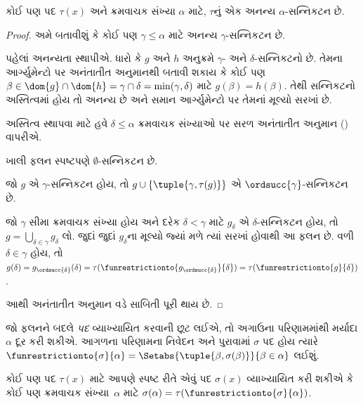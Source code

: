 \begin{lem}[મર્યાદિત પુનરાવર્તન]
કોઈ પણ પદ $\tau(x)$ અને ક્રમવાચક સંખ્યા $\alpha$ માટે,
$\tau$નું એક અનન્ય $\alpha$-સન્નિકટન છે.
\end{lem}
\begin{proof}
અમે બતાવીશું કે કોઈ પણ $\gamma \leq \alpha$ માટે અનન્ય
$\gamma$-સન્નિકટન છે.

પહેલાં અનન્યતા સ્થાપીએ. ધારો કે $g$ અને $h$ અનુક્રમે
$\gamma$- અને $\delta$-સન્નિકટનો છે. તેમના આર્ગ્યુમેન્ટો પર
અનંતાતીત અનુમાનથી બતાવી શકાય કે કોઈ પણ
$\beta \in \dom{g} \cap \dom{h} =
\gamma \cap \delta = \min(\gamma, \delta)$ માટે
$g(\beta) = h(\beta)$. તેથી સન્નિકટનો અસ્તિત્વમાં હોય તો
અનન્ય છે અને સમાન આર્ગ્યુમેન્ટો પર તેમનાં મૂલ્યો સરખાં છે.

અસ્તિત્વ સ્થાપવા માટે હવે $\delta \leq \alpha$ ક્રમવાચક
સંખ્યાઓ પર સરળ અનંતાતીત અનુમાન
() વાપરીએ.

ખાલી ફલન સ્પષ્ટપણે $\emptyset$-સન્નિકટન છે.

જો $g$ એ $\gamma$-સન્નિકટન હોય, તો $g \cup
\{\tuple{\gamma, \tau(g)}\}$ એ $\ordsucc{\gamma}$-સન્નિકટન છે.

જો $\gamma$ સીમા ક્રમવાચક સંખ્યા હોય અને દરેક $\delta < \gamma$
માટે $g_\delta$ એ $\delta$-સન્નિકટન હોય, તો
$g = \bigcup_{\delta \in \gamma} g_\delta$ લો. જુદાં જુદાં
$g_\delta$ના મૂલ્યો જ્યાં મળે ત્યાં સરખાં હોવાથી આ ફલન છે.
વળી $\delta \in \gamma$ હોય, તો
$g(\delta) = g_{\ordsucc{\delta}}(\delta) =
\tau(\funrestrictionto{g_{\ordsucc{\delta}}}{\delta}) =
\tau(\funrestrictionto{g}{\delta})$.

આથી અનંતાતીત અનુમાન વડે સાબિતી પૂરી થાય છે.
\end{proof}

જો ફલનને બદલે \emph{પદ} વ્યાખ્યાયિત કરવાની છૂટ લઈએ, તો અગાઉના
પરિણામમાંથી મર્યાદા $\alpha$ દૂર કરી શકીએ. આગળના પરિણામના નિવેદન
અને પુરાવામાં $\sigma$ પદ હોય ત્યારે
$\funrestrictionto{\sigma}{\alpha} = \Setabs{\tuple{\beta,
\sigma(\beta)}}{\beta \in \alpha}$ લઈશું.

\begin{thm}[સામાન્ય પુનરાવર્તન]
કોઈ પણ પદ $\tau(x)$ માટે આપણે સ્પષ્ટ રીતે એવું પદ
$\sigma(x)$ વ્યાખ્યાયિત કરી શકીએ કે કોઈ પણ ક્રમવાચક
સંખ્યા~$\alpha$ માટે
$\sigma(\alpha) = \tau(\funrestrictionto{\sigma}{\alpha})$.
\end{thm}

